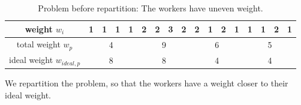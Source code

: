 \begin{table}[H]
\begin{center}
\begin{tabular}{ | c | c | c | c | c | c | c | c | c | c | c | c | c | c | c | c | c | }
            \hline
            weight \(w_i\) & \cellcolor{vs_lightgreen}1 & \cellcolor{vs_lightgreen}1 & \cellcolor{vs_lightgreen}1 & \cellcolor{vs_lightgreen}1 & \cellcolor{vs_lightblue}2 & \cellcolor{vs_lightblue}2 & \cellcolor{vs_lightblue}3 & \cellcolor{vs_lightblue}2 & \cellcolor{vs_lightred}2 & \cellcolor{vs_lightred}1 & \cellcolor{vs_lightred}2 & \cellcolor{vs_lightred}1 & \cellcolor{vs_lightplum}1 & \cellcolor{vs_lightplum}1 & \cellcolor{vs_lightplum}2 & \cellcolor{vs_lightplum}1 \\ 
            \hline
            total weight \(w_p\) & \multicolumn{4}{c|}{\cellcolor{vs_lightgreen}4} & \multicolumn{4}{c|}{\cellcolor{vs_lightblue}9} & \multicolumn{4}{c|}{\cellcolor{vs_lightred}6} & \multicolumn{4}{c|}{\cellcolor{vs_lightplum}5} \\ 
            \hline
            ideal weight \(w_{ideal,p}\) & \multicolumn{4}{c|}{\cellcolor{vs_lightgreen}8} & \multicolumn{4}{c|}{\cellcolor{vs_lightblue}8} & \multicolumn{4}{c|}{\cellcolor{vs_lightred}4} & \multicolumn{4}{c|}{\cellcolor{vs_lightplum}4} \\ 
            \hline
        \end{tabular}
    
        \caption{Problem before repartition: The workers have uneven weight.}\label{table:before_repartition}
    \end{center}
\end{table}

We repartition the problem, so that the workers have a weight closer to their ideal weight.

